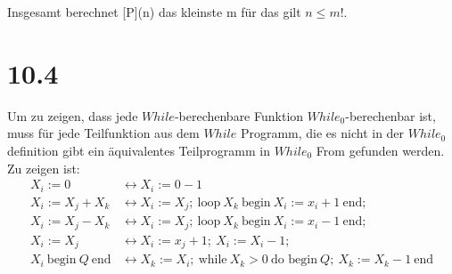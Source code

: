 \documentclass[12pt, a4paper]{article}
\begin{document}
Insgesamt berechnet [P](n) das kleinste m für das gilt $n \le m!$.

\section*{10.4}
Um zu zeigen, dass jede $While$-berechenbare Funktion $While_0$-berechenbar ist, muss f\"ur jede Teilfunktion aus dem $While$ Programm, die es nicht in der $While_0$ definition gibt ein \"aquivalentes Teilprogramm in $While_0$ From gefunden werden. Zu zeigen ist:
\begin{align}
X_i := 0 &\leftrightarrow X_i := 0-1\\
X_i := X_j + X_k &\leftrightarrow X_i := X_j;\ \text{loop} \ X_k \ \text{begin} \ X_i := x_i+1 \ \text{end};\\
X_i := X_j - X_k &\leftrightarrow X_i := X_j;\ \text{loop}\ X_k\ \text{begin}\ X_i := x_i-1\ \text{end};\\
X_i := X_j &\leftrightarrow X_i := x_j+1;\ X_i := X_i-1;\\
 X_i \ \text{begin}\ Q\ \text{end} &\leftrightarrow X_k := X_i;\ \text{while}\ X_k >  0\ \text{do begin}\ Q;\ X_k:=X_k-1\ \text{end}
\end{align}
\end{document}
